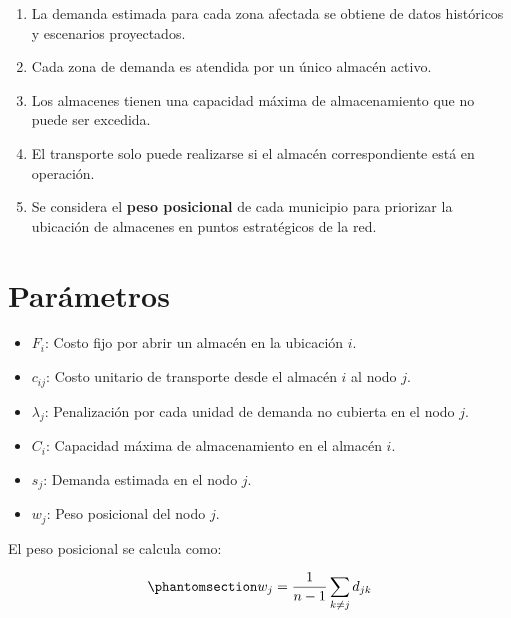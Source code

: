 \documentclass[
  spanish,
  us-letterpaper,
  DIV=11,
  numbers=noendperiod]{scrreprt}
\providecommand{\tightlist}{%
  \setlength{\itemsep}{0pt}\setlength{\parskip}{0pt}}
\numberwithin{equation}{section}
\begin{document}
\begin{enumerate}
\def\labelenumi{\arabic{enumi}.}
\tightlist
\item
  La demanda estimada para cada zona afectada se obtiene de datos
  históricos y escenarios proyectados.\\
\item
  Cada zona de demanda es atendida por un único almacén activo.\\
\item
  Los almacenes tienen una capacidad máxima de almacenamiento que no
  puede ser excedida.\\
\item
  El transporte solo puede realizarse si el almacén correspondiente está
  en operación.\\
\item
  Se considera el \textbf{peso posicional} de cada municipio para
  priorizar la ubicación de almacenes en puntos estratégicos de la red.
\end{enumerate}

\section{Parámetros}\label{paruxe1metros}

\begin{itemize}
\tightlist
\item
  \(F_i\): Costo fijo por abrir un almacén en la ubicación \(i\).\\
\item
  \(c_{ij}\): Costo unitario de transporte desde el almacén \(i\) al
  nodo \(j\).\\
\item
  \(\lambda_j\): Penalización por cada unidad de demanda no cubierta en
  el nodo \(j\).\\
\item
  \(C_i\): Capacidad máxima de almacenamiento en el almacén \(i\).\\
\item
  \(s_j\): Demanda estimada en el nodo \(j\).\\
\item
  \(w_j\): Peso posicional del nodo \(j\).
\end{itemize}

El peso posicional se calcula como:

\begin{equation}\phantomsection\label{eq-PBHE_completa}{
w_j = \frac{1}{n-1} \sum_{k \neq j} d_{jk} 
}\end{equation}
\end{document}
